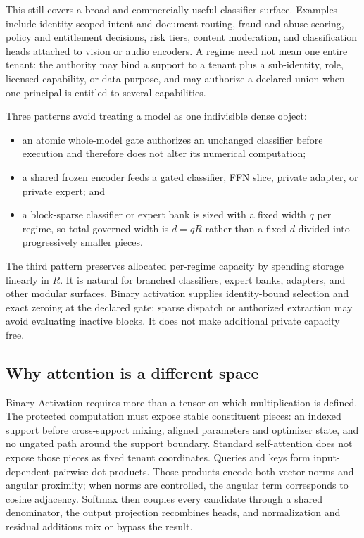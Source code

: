 \documentclass[11pt]{article}
\begin{document}
This still covers a broad and commercially useful classifier surface. Examples
include identity-scoped intent and document routing, fraud and abuse scoring,
policy and entitlement decisions, risk tiers, content moderation, and
classification heads attached to vision or audio encoders. A regime need not
mean one entire tenant: the authority may bind a support to a tenant plus a
sub-identity, role, licensed capability, or data purpose, and may authorize a
declared union when one principal is entitled to several capabilities.

Three patterns avoid treating a model as one indivisible dense object:
\begin{itemize}
  \item an atomic whole-model gate authorizes an unchanged classifier before
  execution and therefore does not alter its numerical computation;
  \item a shared frozen encoder feeds a gated classifier, FFN slice, private
  adapter, or private expert; and
  \item a block-sparse classifier or expert bank is sized with a fixed width
  $q$ per regime, so total governed width is $d=qR$ rather than a fixed $d$
  divided into progressively smaller pieces.
\end{itemize}
The third pattern preserves allocated per-regime capacity by spending storage
linearly in $R$. It is natural for branched classifiers, expert banks, adapters,
and other modular surfaces. Binary activation supplies identity-bound selection
and exact zeroing at the declared gate; sparse dispatch or authorized extraction
may avoid evaluating inactive blocks. It does not make additional private
capacity free.

\subsection{Why attention is a different space}

Binary Activation requires more than a tensor on which multiplication is
defined. The protected computation must expose stable constituent pieces: an
indexed support before cross-support mixing, aligned parameters and optimizer
state, and no ungated path around the support boundary. Standard self-attention
does not expose those pieces as fixed tenant coordinates. Queries and keys form
input-dependent pairwise dot products. Those products encode both vector norms
and angular proximity; when norms are controlled, the angular term corresponds
to cosine adjacency. Softmax then
couples every candidate through a shared denominator, the output projection
recombines heads, and normalization and residual additions mix or bypass the
result.
\end{document}
